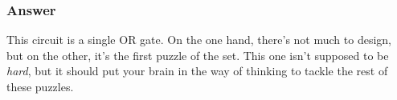 
\vfill 

\subsubsection*{Answer}

This circuit is a single OR gate. On the one hand, there's not much to design, but on the other, it's the first puzzle of the set. This one isn't supposed to be \emph{hard}, but it should put your brain in the way of thinking to tackle the rest of these puzzles. 
